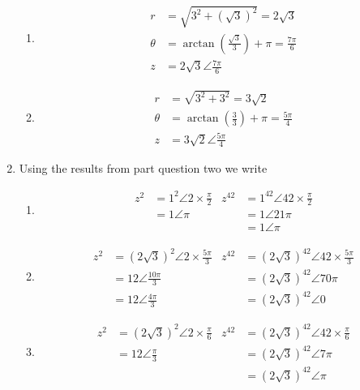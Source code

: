 \documentclass[a4paper]{article}
\begin{document}
\begin{enumerate}
\begin{enumerate}
			\item 
			\begin{align*}
				r &= \sqrt{3^2 + (\sqrt{3})^2} = 2 \sqrt{3} \\
				\theta &= \arctan \left( \tfrac{\sqrt{3}}{3} \right) + \pi = \tfrac{7 \pi}{6} \\
				z &= 2 \sqrt{3} \angle \tfrac{7 \pi}{6}
			\end{align*}
			
			\item 
			\begin{align*}
				r &= \sqrt{3^2 + 3^2} = 3 \sqrt{2} \\
				\theta &= \arctan \left( \tfrac{3}{3} \right) + \pi = \tfrac{5 \pi}{4} \\
				z &= 3 \sqrt{2} \angle \tfrac{5 \pi}{4}
			\end{align*}
		\end{enumerate}
		
		\item Using the results from part question two we write
		\begin{enumerate}
			\item 
			\begin{align*}
				z^2 &= 1^2 \angle 2 \times \tfrac{\pi}{2}		& z^{42} &= 1^{42} \angle 42 \times \tfrac{\pi}{2} \\
				&= 1 \angle \pi											&&= 1 \angle 21 \pi \\
																	   &&&= 1 \angle \pi
			\end{align*}
			
			\item 
			\begin{align*}
				z^2 &= (2 \sqrt{3})^2 \angle 2 \times \tfrac{5 \pi}{3}		& z^{42} &= (2 \sqrt{3})^{42} \angle 42 \times \tfrac{5 \pi}{3} \\
				&= 12 \angle \tfrac{10 \pi}{3}								&&= (2 \sqrt{3})^{42} \angle 70 \pi \\
				&= 12 \angle \tfrac{4 \pi}{3}								&&= (2 \sqrt{3})^{42} \angle 0
			\end{align*}
			
			\item 
			\begin{align*}
				z^2 &= (2 \sqrt{3})^2 \angle 2 \times \tfrac{\pi}{6}		& z^{42} &= (2 \sqrt{3})^{42} \angle 42 \times \tfrac{\pi}{6} \\
				&= 12 \angle \tfrac{\pi}{3}											&&= (2 \sqrt{3})^{42} \angle 7 \pi \\
																				   &&&= (2 \sqrt{3})^{42} \angle \pi 
			\end{align*}
			

\end{enumerate}
\end{enumerate}
\end{document}

